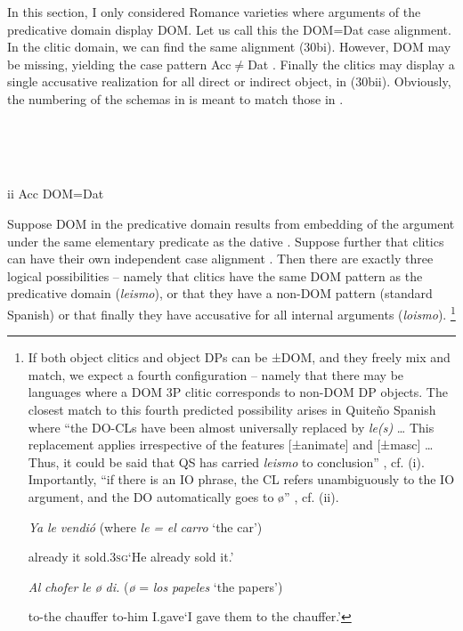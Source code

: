 \documentclass[output=paper]{langscibook}
\begin{document}
In this section, I only considered Romance varieties where arguments of the predicative domain display DOM. Let us call this the DOM=Dat case alignment. In the clitic domain, we can find the same alignment (30bi). However, DOM may be missing, yielding the case pattern Acc${\neq}$Dat . Finally the clitics may display a single accusative realization for all direct or indirect object, in (30bii). Obviously, the numbering of the schemas in  is meant to match those in .

\ea\label{ex:manzini:}
{} \\
\z

\ea\label{ex:manzini:}
\\
\ea\label{ex:manzini:}
 \\
ii  Acc        DOM=Dat 
\z 
\z 

Suppose DOM in the predicative domain results from embedding of the argument under the same elementary predicate as the dative . Suppose further that clitics can have their own independent case alignment . Then there are exactly three logical possibilities – namely that clitics have the same DOM pattern as the predicative domain (\textit{leismo}), or that they have a non-DOM pattern (standard Spanish) or that finally they have accusative for all internal arguments (\textit{loismo}).{} \footnote{If both object clitics and object DPs can be ±DOM, and they freely mix and match, we expect a fourth configuration – namely that there may be languages where a DOM 3P clitic corresponds to non-DOM DP objects. The closest match to this fourth predicted possibility arises in Quiteño Spanish where “the DO-CLs have been almost universally replaced by \textit{le(s)} … This replacement applies irrespective of the features [±animate] and [±masc] …Thus, it could be said that QS has carried \textit{leismo} to conclusion” \citep[387-388]{Suñer1989}, cf. (i). Importantly, “if there is an IO phrase, the CL refers unambiguously to the IO argument, and the DO automatically goes to ø” \citep[389]{Suñer1989}, cf. (ii).  

\ea
\textit{Ya} \textit{le}   \textit{vendió}      (where \textit{le} \textit{=} \textit{el} \textit{carro} ‘the car’)

\z

\ea
already   it   sold\textsc{.3sg}‘He already sold it.’
 
\textit{Al} \textit{chofer}     \textit{le}   \textit{ø} \textit{di.}   (\textit{ø} = \textit{los} \textit{papeles} ‘the papers’)

\z
to-the chauffer   to-him   I.gave‘I gave them to the chauffer.’}
\end{document}
